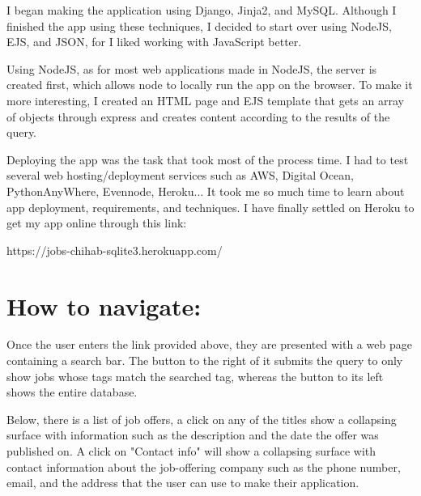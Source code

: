 \documentclass[french]{article}
\begin{document}
		I began making the application using Django, Jinja2, and MySQL. Although I finished the app using these techniques, I decided to start over using NodeJS, EJS, and JSON, for I liked working with JavaScript better.
		
		Using NodeJS, as for most web applications made in NodeJS, the server is created first, which allows node to locally run the app on the browser. To make it more interesting, I created an HTML page and EJS template that gets an array of objects through express and creates content according to the results of the query.
		
		Deploying the app was the task that took most of the process time. I had to test several web hosting/deployment services such as AWS, Digital Ocean, PythonAnyWhere, Evennode, Heroku... It took me so much time to learn about app deployment, requirements, and techniques. I have finally settled on Heroku to get my app online through this link:
		\vspace{0.25cm}
		
		https://jobs-chihab-sqlite3.herokuapp.com/
		
	\section{How to navigate:}
		Once the user enters the link provided above, they are presented with a web page containing a search bar. The button to the right of it submits the query to only show jobs whose tags match the searched tag, whereas the button to its left shows the entire database.
		
		Below, there is a list of job offers, a click on any of the titles show a collapsing surface with information such as the description and the date the offer was published on. A click on "Contact info" will show a collapsing surface with contact information about the job-offering company such as the phone number, email, and the address that the user can use to make their application.
\end{document}
